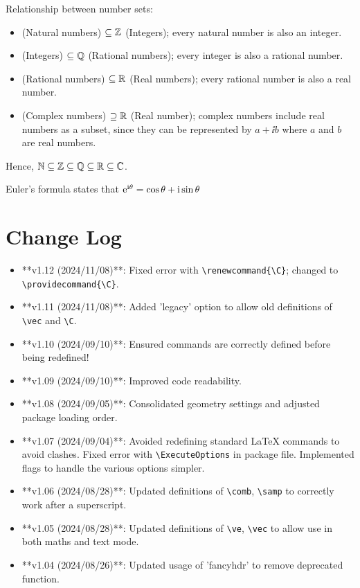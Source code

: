 \documentclass{article}
\begin{document}
\begin{center}
    \begin{minipage}{0.7\textwidth}
        Relationship between number sets:
        \begin{itemize}
          \item \N{} (Natural numbers) $\subseteq \mathbb{Z}$ (Integers); every natural number is also an integer.
          \item \Z{} (Integers) $\subseteq \mathbb{Q}$ (Rational numbers); every integer is also a rational number.
          \item \Q{} (Rational numbers) $\subseteq \mathbb{R}$ (Real numbers); every rational number is also a real number.
          \item \Complex{} (Complex numbers) $\supseteq \mathbb{R}$ (Real number); complex numbers include real numbers as a subset, since they can be represented by $a+\ii b$ where $a$ and $b$ are real numbers.
        \end{itemize}
        Hence, $\mathbb{N}\subseteq\mathbb{Z}\subseteq\mathbb{Q}\subseteq\mathbb{R}\subseteq\mathbb{C}$.
        
        Euler's formula states that $\mathrm{e}^{\mathrm{i}\theta} = \cos\theta + \mathrm{i}\sin\theta$
    \end{minipage}
\end{center}
\section{Change Log}

\begin{itemize}
\item **v1.12 (2024/11/08)**: Fixed error with \verb|\renewcommand{\C}|; changed to \verb|\providecommand{\C}|.
\item **v1.11 (2024/11/08)**: Added 'legacy' option to allow old definitions of \verb|\vec| and \verb|\C|.
\item **v1.10 (2024/09/10)**: Ensured commands are correctly defined before being redefined!
\item **v1.09 (2024/09/10)**: Improved code readability.
\item **v1.08 (2024/09/05)**: Consolidated geometry settings and adjusted package loading order.
\item **v1.07 (2024/09/04)**: Avoided redefining standard LaTeX commands to avoid clashes. Fixed error with \verb|\ExecuteOptions| in package file. Implemented flags to handle the various options simpler.
\item **v1.06 (2024/08/28)**: Updated definitions of \verb|\comb|, \verb|\samp| to correctly work after a superscript.
\item **v1.05 (2024/08/28)**: Updated definitions of \verb|\ve|, \verb|\vec| to allow use in both maths and text mode.
\item **v1.04 (2024/08/26)**: Updated usage of 'fancyhdr' to remove deprecated function.
\end{itemize}
\end{document}
